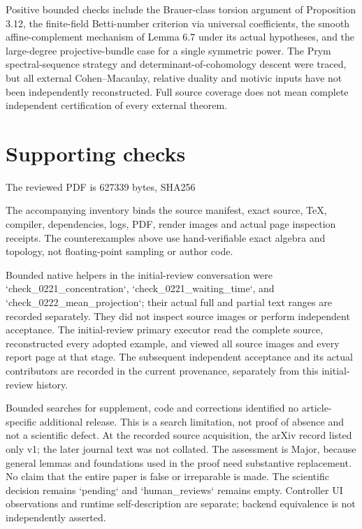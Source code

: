 \documentclass[10pt]{article}
\begin{document}
Positive bounded checks include the Brauer-class torsion argument of Proposition 3.12, the finite-field Betti-number criterion via universal coefficients, the smooth affine-complement mechanism of Lemma 6.7 under its actual hypotheses, and the large-degree projective-bundle case for a single symmetric power. The Prym spectral-sequence strategy and determinant-of-cohomology descent were traced, but all external Cohen–Macaulay, relative duality and motivic inputs have not been independently reconstructed. Full source coverage does not mean complete independent certification of every external theorem.\par
\section*{Supporting checks}
The reviewed PDF is 627339 bytes, SHA256\par
The accompanying inventory binds the source manifest, exact source, TeX, compiler, dependencies, logs, PDF, render images and actual page inspection receipts. The counterexamples above use hand-verifiable exact algebra and topology, not floating-point sampling or author code.\par
Bounded native helpers in the initial-review conversation were `check\_0221\_concentration`, `check\_0221\_waiting\_time`, and `check\_0222\_mean\_projection`; their actual full and partial text ranges are recorded separately. They did not inspect source images or perform independent acceptance. The initial-review primary executor read the complete source, reconstructed every adopted example, and viewed all source images and every report page at that stage. The subsequent independent acceptance and its actual contributors are recorded in the current provenance, separately from this initial-review history.\par
Bounded searches for supplement, code and corrections identified no article-specific additional release. This is a search limitation, not proof of absence and not a scientific defect. At the recorded source acquisition, the arXiv record listed only v1; the later journal text was not collated. The assessment is Major, because general lemmas and foundations used in the proof need substantive replacement. No claim that the entire paper is false or irreparable is made. The scientific decision remains `pending` and `human\_reviews` remains empty. Controller UI observations and runtime self-description are separate; backend equivalence is not independently asserted.\par
\end{document}
